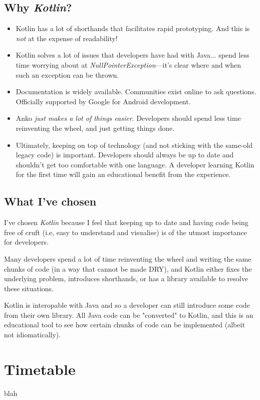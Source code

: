 \documentclass[a4paper]{article}
\begin{document}
\subsection{Why \emph{Kotlin}?}
\begin{itemize}
	\item Kotlin has a lot of shorthands that facilitates rapid prototyping. And this is \emph{not} at the expense of readability!
	\item Kotlin solves a lot of issues that developers have had with Java... spend less time worrying about at \emph{NullPointerException}---it's clear where and when such an exception can be thrown.
	\item Documentation is widely available. Communities exist online to ask questions. Officially supported by Google for Android development.
	\item Anko \emph{just makes a lot of things easier}. Developers should spend less time reinventing the wheel, and just getting things done.
	\item Ultimately, keeping on top of technology (and not sticking with the same-old legacy code) is important. Developers should always be up to date and shouldn't get too comfortable with one language. A developer learning Kotlin for the first time will gain an educational benefit from the experience.
\end{itemize}

\subsection{What I've chosen}
I've chosen \emph{Kotlin} because I feel that keeping up to date and having code being free of cruft (i.e, easy to understand and visualise) is of the utmost importance for developers.

Many developers spend a lot of time reinventing the wheel and writing the same chunks of code (in a way that cannot be made DRY), and Kotlin either fixes the underlying problem, introduces shorthands, or has a library available to resolve these situations.

Kotlin is interopable with Java and so a developer can still introduce some code from their own library. All Java code can be "converted" to Kotlin, and this is an educational tool to see how certain chunks of code can be implemented (albeit not idiomatically).

\section{Timetable}
blah
\end{document}
